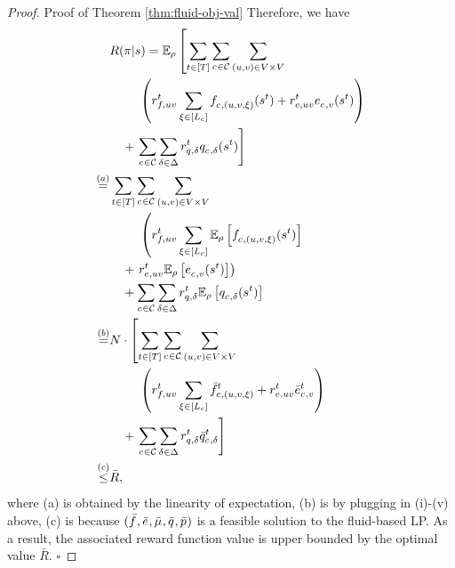 \begin{proof}{Proof of Theorem \ref{thm:fluid-obj-val}}
    Therefore, we have
    \begin{align*}
        &R(\pi \vert s) = \mathbb{E}_{\rho}  \left[\sum_{t \in [T]}^{} \sum_{c_{} \in \mathcal{C}} \sum_{(u, v) \in V \times V} \right. \\
        &\qquad\  \left(r^{t}_{f ,uv}  \sum_{\xi \in [L_c]}^{} f^{}_{c_{}, (u, v, \xi)}(s^{t}) + r^{t}_{e ,uv} e^{}_{c_{}, v}(s^t) \right)\\ 
        &\quad+ \left. \sum_{c_{} \in \mathcal{C}}\sum_{\delta \in \Delta} r^{t}_{q ,\delta} q^{}_{c_{},\delta}(s^t) \right]\\
        \stackrel{(a)}{=}& \sum_{t \in [T]}^{} \sum_{c_{} \in \mathcal{C}} \sum_{(u, v) \in V \times V} \\
        &\qquad\ \left( r^{t}_{f ,uv} \sum_{\xi \in [L_c]}^{} \mathbb{E}_{\rho}  \left[f^{}_{c_{}, (u, v, \xi)}(s^{t}) \right] \right. \\ 
        &\quad+ \left. r^{t}_{e ,uv} \mathbb{E}_{\rho}  \left[e^{}_{c_{}, v}(s^t) \right]\right) \\ 
        &\quad+ \sum_{c_{} \in \mathcal{C}}\sum_{\delta \in \Delta} r^{t}_{q ,\delta} \mathbb{E}_{\rho}  \left[q^{}_{c_{},\delta}(s^t) \right]\\
        \stackrel{(b)}{=}& N \cdot \left[\sum_{t \in [T]}^{} \sum_{c_{} \in \mathcal{C}} \sum_{(u, v) \in V \times V} \right. \\
        &\qquad\  \left(r^{t}_{f ,uv}  \sum_{\xi \in [L_c]}^{} \bar{f}^{t}_{c_{}, (u, v, \xi)} + r^{t}_{e ,uv} \bar{e}^{t}_{c_{}, v} \right)\\ 
        &\quad+ \left. \sum_{c_{} \in \mathcal{C}}\sum_{\delta \in \Delta} r^{t}_{q ,\delta} \bar{q}^{t}_{c_{},\delta} \right]\\
        \stackrel{(c)}{\leq}& \bar{R}, 
    \end{align*}
    where (a) is obtained by the linearity of expectation, (b) is by plugging in (i)-(v) above, (c) is because $(\bar{f}^{}_{}, \bar{e}^{}_{}, \bar{\mu}^{}_{}, \bar{q}^{}_{}, \bar{p}^{}_{})$ is a feasible solution to the fluid-based LP. As a result, the associated reward function value is upper bounded by the optimal value $\bar{R}$.
    \hfill $\square$
\end{proof}